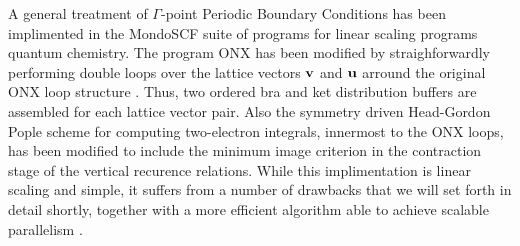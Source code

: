 \documentclass[prb,aps,nobibnotes,twocolumn,doublespace,twocolumngrid,superbib]{revtex4}
\begin{document}
A general treatment of $\Gamma$-point Periodic Boundary Conditions has been implimented in the MondoSCF
suite of programs for linear scaling programs quantum chemistry.  The program {\sc ONX} \cite{} has been 
modified by straighforwardly performing double loops over the lattice vectors $\bf v$ and $\bf u$
arround the original ONX loop structure \cite{}.  Thus, two ordered bra and ket distribution buffers are 
assembled for each lattice vector pair.   Also the symmetry driven Head-Gordon Pople scheme for 
computing two-electron integrals, innermost to the ONX loops, has been modified to include the 
minimum image criterion in the contraction stage of the vertical recurence relations.  While this 
implimentation is linear scaling and simple, it suffers from a number of drawbacks that we will set 
forth in detail shortly, together with a more efficient algorithm able to achieve scalable parallelism \cite{}.
\end{document}
